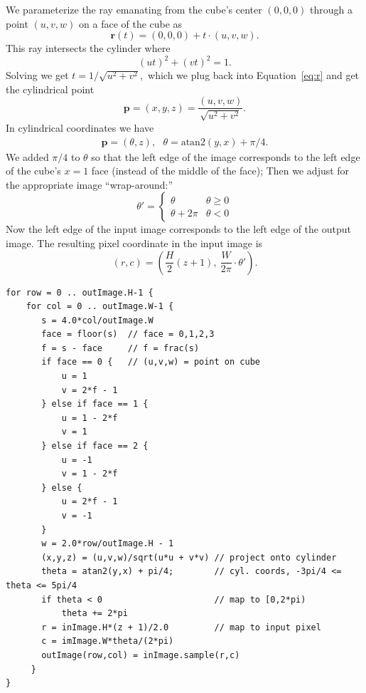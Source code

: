 \documentclass[11pt, oneside]{article}   	%
\begin{document}
We parameterize the ray emanating from 
the cube's center $(0,0,0)$ through a point $(u,v,w)$ on a face of the cube as
\begin{equation}
  \mathbf{r}(t) = (0,0,0) + t\cdot(u,v,w). \label{eq:r}
\end{equation}
This ray intersects the cylinder where
\begin{equation}
  (ut)^2 + (vt)^2 = 1.
\end{equation}
Solving we get $t = 1/\sqrt{u^2 + v^2},$ which we plug back into Equation~\ref{eq:r} and
get the cylindrical point
\begin{equation}
  \mathbf{p} = (x,y,z) = \frac{(u,v,w)}{\sqrt{u^2 + v^2}}. \label{eq:p-cyl}
\end{equation}
In cylindrical coordinates we have
\begin{eqnarray}
\mathbf{p} = \left(\theta, z\right), \ \ \ 
  \theta = \mbox{atan2}\left(y,x\right) + \pi/4. \label{eq:theta}
\end{eqnarray}
We added $\pi/4$ to $\theta$ so that the left edge of the image corresponds to
the left edge of the cube's $x = 1$ face (instead of the middle of the face);
Then we adjust for the appropriate image ``wrap-around:''
\begin{equation}
\theta' = \left\{\begin{array}{ll}
  \theta        & \theta \geq 0 \\
  \theta + 2\pi & \theta < 0
  \end{array}\right.
\end{equation}
Now the left edge of the input image corresponds to the left edge of the output image.
The resulting pixel coordinate in the input image is
\begin{equation}
(r,c) = \left(\frac{H}{2}\left(z + 1\right),\ \frac{W}{2\pi}\cdot \theta'\right).
\end{equation}




\begin{verbatim}
for row = 0 .. outImage.H-1 {
    for col = 0 .. outImage.W-1 {
       s = 4.0*col/outImage.W
       face = floor(s)  // face = 0,1,2,3
       f = s - face     // f = frac(s)
       if face == 0 {   // (u,v,w) = point on cube
           u = 1
           v = 2*f - 1
       } else if face == 1 {
           u = 1 - 2*f
           v = 1
       } else if face == 2 {
           u = -1
           v = 1 - 2*f
       } else {
           u = 2*f - 1
           v = -1
       }
       w = 2.0*row/outImage.H - 1
       (x,y,z) = (u,v,w)/sqrt(u*u + v*v) // project onto cylinder
       theta = atan2(y,x) + pi/4;        // cyl. coords, -3pi/4 <= theta <= 5pi/4
       if theta < 0                      // map to [0,2*pi)
           theta += 2*pi
       r = inImage.H*(z + 1)/2.0         // map to input pixel
       c = imImage.W*theta/(2*pi)
       outImage(row,col) = inImage.sample(r,c)
     }
}
\end{verbatim}
\end{document}
